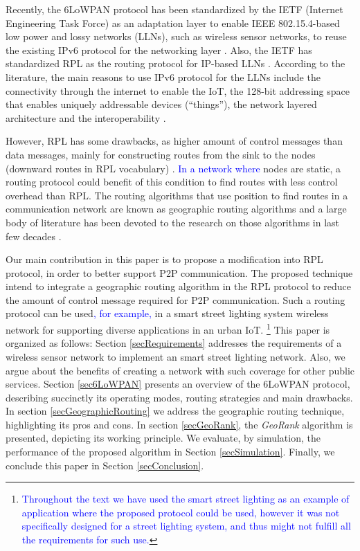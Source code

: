 \documentclass[final,authoryear,3p,twocolumn]{elsarticle}
\newcommand{\removed}[1]{}
\newcommand{\rev}{\textcolor{blue}}
\begin{document}
Recently, the 6LoWPAN protocol has been standardized by the IETF (Internet Engineering Task Force) as an adaptation layer to enable IEEE 802.15.4-based low power and lossy networks (LLNs), such as wireless sensor networks, to reuse the existing IPv6 protocol for the networking layer \citep{RFC4944}. Also, the IETF has standardized RPL as the routing protocol for IP-based LLNs \citep{RFC6550}. According to the literature, the main reasons to use IPv6 protocol for the LLNs include the connectivity through the internet to enable the IoT, the 128-bit addressing space that enables uniquely addressable devices (``things''), the network layered architecture and the interoperability \citep{IPv6_LLN_2010, Smart_City_IOT_2014b}.

However, RPL has some drawbacks, as higher amount of control messages than data messages, mainly for constructing routes from the sink to the nodes (downward routes in RPL vocabulary) \citep{Heurtefeux_RPL_2013,P2P_analysis_2010,P2P-RPL_2011}. \removed{In a street light system,}\rev{In a network where} nodes are static, \removed{and}a routing protocol could benefit of this condition to find routes with less control overhead than RPL. The routing algorithms that use position to find routes in a communication network are known as geographic routing algorithms and a large body of literature has been devoted to the research on those algorithms in last few decades \citep{Karp_GPSR_2000, GOAFR_2008, Denardin2011}.

Our main contribution in this paper is to propose a modification into RPL protocol, in order to better support P2P communication. The proposed technique intend to integrate a geographic routing algorithm in the RPL protocol to reduce the amount of control message required for P2P communication.\removed{We further propose that} Such a routing protocol can be used\rev{, for example,} in a smart street lighting system \removed{based on IPv6-enabled} wireless \removed{sensor}network for supporting diverse applications in an urban IoT. \footnote{\rev{Throughout the text we have used the smart street lighting as an example of application where the proposed protocol could be used, however it was not specifically designed for a street lighting system, and thus might not fulfill all the requirements for such use.}} This paper is organized as follows: Section \ref{secRequirements} addresses the requirements of a wireless sensor network to implement an smart street lighting network. Also, we argue about the benefits of creating a network with such coverage for other public services. Section \ref{sec6LoWPAN} presents an overview of the 6LoWPAN protocol, describing succinctly its operating modes, routing strategies and main drawbacks. In section \ref{secGeographicRouting} we address the geographic routing technique, highlighting its pros and cons. In section \ref{secGeoRank}, the \textit{GeoRank} algorithm is presented, depicting its working principle. We evaluate, by simulation, the performance of the proposed algorithm in Section \ref{secSimulation}. Finally, we conclude this paper in Section \ref{secConclusion}.
\end{document}
